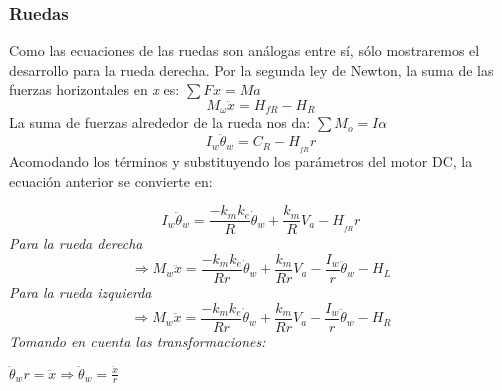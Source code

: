 \documentclass[10pt]{article}
\begin{document}
\subsubsection{Ruedas}
Como las ecuaciones de las ruedas son análogas entre sí, sólo mostraremos el desarrollo para la rueda derecha.
Por la segunda ley de Newton, la suma de las fuerzas horizontales en \emph{x} es:
\vspace{2 mm}
 $\sum{F_{}x} = Ma$
\vspace{1 mm}
\begin{equation} 
M_{\omega}\ddot{x} = H_{fR} - H_{R}
\end{equation} 
\vspace{2 mm}
La suma de fuerzas alrededor de la rueda nos da:
\vspace{2 mm}
$\sum{M_{o}} = I\alpha$
\vspace{1 mm}
\begin{equation} 
I_{w}\ddot{\theta}_{w} = C_{R} - H_{_{fR}}r
\end{equation} 
\vspace{2 mm}
Acomodando los términos y substituyendo los parámetros del motor DC, la ecuación anterior se convierte en:

\vspace{2 mm}
\begin{equation} 
I_{w}\ddot{\theta}_{w} = \frac{-k_{m}k_{e}}{R}\dot{\theta}_{w} + \frac{k_{m}}{R}V_{a} - H_{_{fR}}r
\end{equation} 
\vspace{2 mm}
\emph{Para la rueda derecha}
\vspace{2 mm}
\begin{equation} 
\Rightarrow M_{w}\ddot{x} = \frac{-k_{m}k_{e}}{Rr}\dot{\theta}_{w} + \frac{k_{m}}{Rr}V_{a} - \frac{I_{w}}{r}\ddot{\theta}_{w} - H_{L}
\end{equation} 
\vspace{2 mm}
\emph{Para la rueda izquierda}
\vspace{2 mm}
\begin{equation} 
\Rightarrow M_{w}\ddot{x} = \frac{-k_{m}k_{e}}{Rr}\dot{\theta}_{w} + \frac{k_{m}}{Rr}V_{a} - \frac{I_{w}}{r}\ddot{\theta}_{w} - H_{R}
\end{equation} 
\vspace{2 mm}
\emph{Tomando en cuenta las transformaciones:}\
\vspace{2 mm}

$\ddot{\theta}_{w}r = \ddot{x} \Rightarrow \ddot{\theta}_{w} = \frac{\ddot{x}}{r}$
\end{document}
